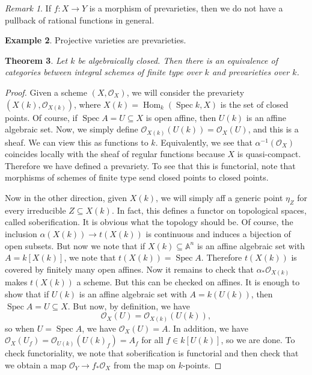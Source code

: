 \documentclass[leqno, openany]{memoir}
\newtheorem{thm}{Theorem}[section]
\theoremstyle{definition}
\newtheorem{exm}[thm]{Example}
\theoremstyle{remark}
\newtheorem{rmk}[thm]{Remark}
\theoremstyle{plain}
\theoremstyle{definition}
\theoremstyle{remark}
\newcommand{\A}{\mathbb{A}}
\newcommand{\mc}[1]{\mathcal{#1}}
\DeclareMathOperator{\Hom}{Hom}
\DeclareMathOperator{\Spec}{Spec}
\begin{document}
\begin{rmk}
    If $f \colon X \to Y$ is a morphism of prevarieties, then we do not have a pullback of rational functions in general.
\end{rmk}

\begin{exm}
    Projective varieties are prevarieties.
\end{exm}

\begin{thm}
    Let $k$ be algebraically closed. Then there is an equivalence of categories between integral schemes of finite type over $k$ and prevarieties over $k$. 
\end{thm}

\begin{proof}
    Given a scheme $(X, \mc{O}_X)$, we will consider the prevariety $(X(k), \mc{O}_{X(k)})$, where $X(k) = \Hom_k(\Spec k, X)$ is the set of closed points. Of course, if $\Spec A = U \subseteq X$ is open affine, then $U(k)$ is an affine algebraic set. Now, we simply define $\mc{O}_{X(k)} (U(k)) = \mc{O}_X(U)$, and this is a sheaf. We can view this as functions to $k$. Equivalently, we see that $\alpha^{-1}(\mc{O}_X)$ coincides locally with the sheaf of regular functions because $X$ is quasi-compact. Therefore we have defined a prevariety. To see that this is functorial, note that morphisms of schemes of finite type send closed points to closed points.

    Now in the other direction, given $X(k)$, we will simply aff a generic point $\eta_Z$ for every irreducible $Z \subseteq X(k)$. In fact, this defines a functor on topological spaces, called soberification. It is obvious what the topology should be. Of course, the inclusion $\alpha(X(k)) \to t(X(k))$ is continuous and induces a bijection of open subsets. But now we note that if $X(k) \subseteq \A^n$ is an affine algebraic set with $A = k[X(k)]$, we note that $t(X(k)) = \Spec A$. Therefore $t(X(k))$ is covered by finitely many open affines. Now it remains to check that $\alpha_* \mc{O}_{X(k)}$ makes $t(X(k))$ a scheme. But this can be checked on affines. It is enough to show that if $U(k)$ is an affine algebraic set with $A = k(U(k))$, then $\Spec A = U \subseteq X$. But now, by definition, we have
    \[ \mc{O}_X(U) = \mc{O}_{X(k)}(U(k)), \]
    so when $U = \Spec A$, we have $\mc{O}_X(U) = A$. In addition, we have $\mc{O}_X(U_f) = \mc{O}_{U(k)}({U(k)}_f) = A_f$ for all $f \in k[U(k)]$, so we are done. To check functoriality, we note that soberification is functorial and then check that we obtain a map $\mc{O}_Y \to f_* \mc{O}_X$ from the map on $k$-points.
\end{proof}
\end{document}
